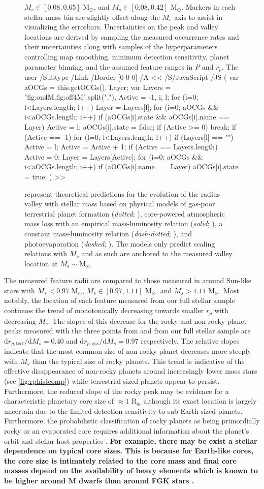 \documentclass[twocolumn]{emulateapj}
\newcommand{\cdbox}[1]{%
  \colorlet{currentcolor}{.}%
  {\color{Blue1}%
    \dbox{\color{currentcolor}#1}}%
}
\newcommand{\ToggleLayer}[2]{%
  \leavevmode
  \pdfstartlink user {
    /Subtype /Link
    /Border [0 0 0]%
    /A <<
      /S/JavaScript
      /JS (
         var aOCGs = this.getOCGs(), Layer;
         var Layers = "#1".split(","), Active = -1, i, l;
         for (l=0; l<Layers.length; l++) {
           Layer = Layers[l];
           for (i=0; aOCGs && i<aOCGs.length; i++) {
             if (aOCGs[i].state && aOCGs[i].name == Layer) {
               Active = l;
               aOCGs[i].state = false;
             }
           }
           if (Active >= 0) break;
         }
         if (Active == -1) {
           for (l=0; l<Layers.length; l++) {
             if (Layers[l] == "") Active = l;
           }
         }
         Active = Active + 1;
         if (Active == Layers.length) Active = 0;
         Layer = Layers[Active];
         for (i=0; aOCGs && i<aOCGs.length; i++) {
           if (aOCGs[i].name == Layer) aOCGs[i].state = true;
         }
      )
    >>
  }#2%
  \pdfendlink
}
\begin{document}
\begin{figure}
{    $M_s \in [0.08,0.65]$ M$_{\odot}$, and $M_s \in [0.08,0.42]$ M$_{\odot}$. Markers in each stellar mass bin are slightly
    offset along the $M_s$ axis to assist in visualizing the errorbars. Uncertainties on the
    peak and valley locations are derived by sampling the measured occurrence rates and their uncertainties along
    with samples of the hyperparameters controlling map smoothing, minimum detection sensitivity, planet parameter
    binning, and the assumed feature ranges in $P$ and $r_p$. The
    \ToggleLayer{fig:on4M,fig:off4M}{\protect\cdbox{\emph{green curves}}}
    represent theoretical predictions for the evolution of the radius valley with stellar mass based on
    physical models of gas-poor terrestrial planet formation (\emph{dotted}; \citealt{lopez18}),
    core-powered atmospheric mass loss
    with an empirical mass-luminosity relation (\emph{solid}; \citealt{gupta19b}), a constant mass-luminosity
    relation (\emph{dash-dotted}; \citealt{gupta19b}), and photoevaporation (\emph{dashed}; \citealt{wu19}).
    The models only predict scaling relations with $M_s$ and as such are anchored to the measured valley location
    at $M_s \sim \text{M}_{\odot}$.}
  \label{fig:rpvMs}
\end{figure}


The measured feature radii are compared to those measured in \cite{fulton18} around Sun-like stars with
$M_s <0.97$ M$_{\odot}$, $M_s \in [0.97,1.11]$ M$_{\odot}$, and $M_s >1.11$ M$_{\odot}$.
Most notably, the location of each feature measured from our full stellar sample continues the trend of monotonically
decreasing towards smaller $r_p$ with decreasing $M_s$. The slopes of this decrease for the rocky and non-rocky
planet peaks measured with the three points from \cite{fulton18} and from our full stellar sample
are $\text{d}r_{p,\text{terr}} / \text{d}M_s = 0.40$ and $\text{d}r_{p,\text{gas}} / \text{d}M_s = 0.97$
respectively. The relative slopes indicate that the most common size of
non-rocky planet decreases more steeply with $M_s$ than the typical size of rocky planets. This trend
is indicative of the effective disappearance of non-rocky planets around increasingly lower mass stars
(see \autoref{fig:rphistcomp}) while terrestrial-sized planets appear to persist.
Furthermore, the reduced slope of the rocky peak may be evidence for
a characteristic planetary core size of $\approx 1$ R$_{\oplus}$ although its exact location is largely uncertain
due to the limited detection sensitivity to sub-Earth-sized planets. Furthermore, the probabilistic classification
of rocky planets as being primordially rocky or an evaporated core requires additional information
about the planet's orbit and stellar host properties \citep{neil19b}. 
\textbf{For example, there may be exist a stellar dependence on typical core sizes.
  This is because for Earth-like cores, the core size is intimately related to the core mass and
  final core masses depend on the availability of heavy elements which
is known to be higher around M dwarfs than around FGK stars \citep{mulders15a,mulders15b,neil19}.}
\end{document}
